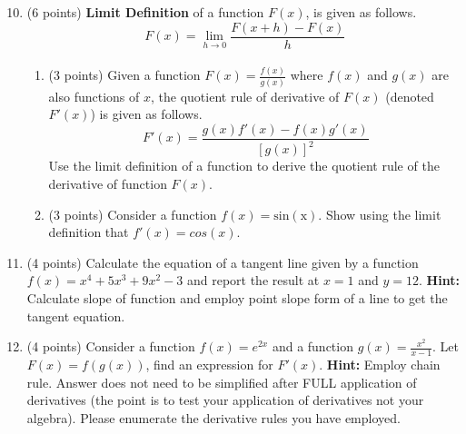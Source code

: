 \documentclass{article}%
\begin{document}
\begin{enumerate}
    \setcounter{enumi}{9}
    \item (6 points) \textbf{Limit Definition} of a function $F(x)$, is given as follows.
    \begin{equation*}
        F(x) = \lim\limits_{h\xrightarrow[]{} 0}\frac{F(x+h) - F(x)}{h}
    \end{equation*}
    \begin{enumerate}
    \item (3 points) Given a function $F(x) = \frac{f(x)}{g(x)}$ where $f(x)$ and $g(x)$ are also functions of $x$, the quotient rule of derivative of $F(x)$ (denoted $F'(x)$) is given as follows. 
    \begin{equation*}
        F'(x) = \frac{g(x)f'(x) - f(x)g'(x)}{[g(x)]^2}
    \end{equation*}
    Use the limit definition of a function to derive the quotient rule of the derivative of function $F(x)$.\vspace{2ex}
    \item (3 points) Consider a function $f(x) = \mathrm{sin(x)}$. Show using the limit definition that $f'(x)= cos(x)$.
\end{enumerate}
\item (4 points) Calculate the equation of a tangent line given by a function $f(x) = x^4 + 5x^3+9x^2-3$ and report the result at $x=1$ and $y = 12$. \textbf{Hint:} Calculate slope of function and employ point slope form of a line to get the tangent equation.

\item (4 points) Consider a function $f(x) = e^{2x}$ and a function $g(x) = \frac{x^2}{x-1}$. Let $F(x) = f(g(x))$, find an expression for $F'(x)$. \textbf{Hint:} Employ chain rule. Answer does not need to be simplified after FULL application of derivatives (the point is to test your application of derivatives not your algebra). Please enumerate the derivative rules you have employed.


\end{enumerate}
\end{document}
